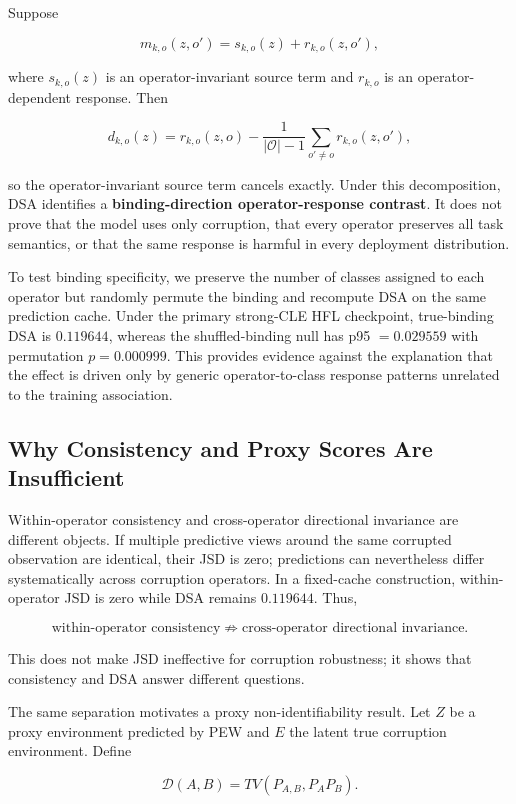 \documentclass[10pt,twocolumn]{article}
\begin{document}
Suppose

\[
m_{k,o}(z,o')=s_{k,o}(z)+r_{k,o}(z,o'),
\]

where \(s_{k,o}(z)\) is an operator-invariant source term and \(r_{k,o}\) is an operator-dependent response. Then

\[
d_{k,o}(z)=r_{k,o}(z,o)
-\frac{1}{|\mathcal O|-1}\sum_{o'\neq o}r_{k,o}(z,o'),
\]

so the operator-invariant source term cancels exactly. Under this decomposition, DSA identifies a \textbf{binding-direction operator-response contrast}. It does not prove that the model uses only corruption, that every operator preserves all task semantics, or that the same response is harmful in every deployment distribution.

To test binding specificity, we preserve the number of classes assigned to each operator but randomly permute the binding and recompute DSA on the same prediction cache. Under the primary strong-CLE HFL checkpoint, true-binding DSA is \(0.119644\), whereas the shuffled-binding null has p95 \(=0.029559\) with permutation \(p=0.000999\). This provides evidence against the explanation that the effect is driven only by generic operator-to-class response patterns unrelated to the training association.

\subsection{Why Consistency and Proxy Scores Are Insufficient}

Within-operator consistency and cross-operator directional invariance are different objects. If multiple predictive views around the same corrupted observation are identical, their JSD is zero; predictions can nevertheless differ systematically across corruption operators. In a fixed-cache construction, within-operator JSD is zero while DSA remains \(0.119644\). Thus,

\[
\text{within-operator consistency}\not\Rightarrow
\text{cross-operator directional invariance}.
\]

This does not make JSD ineffective for corruption robustness; it shows that consistency and DSA answer different questions.

The same separation motivates a proxy non-identifiability result. Let \(Z\) be a proxy environment predicted by PEW and \(E\) the latent true corruption environment. Define

\[
\mathcal D(A,B)=TV(P_{A,B},P_AP_B).
\]
\end{document}
